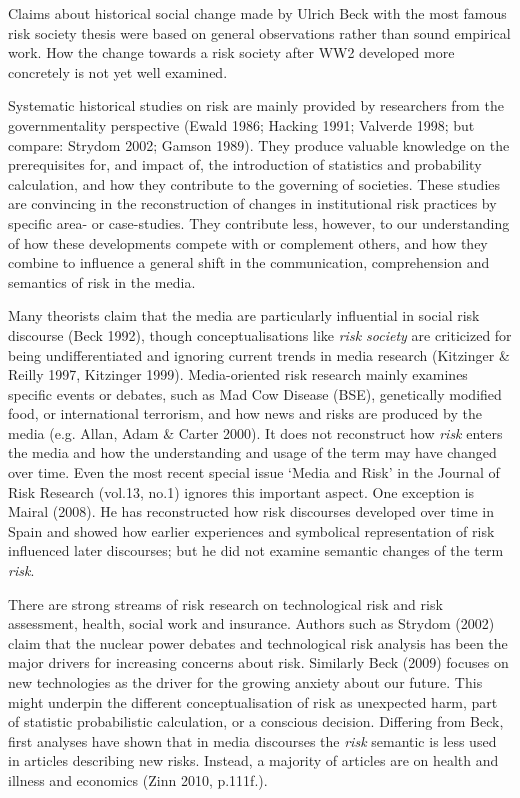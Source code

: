 \documentclass{report}
\begin{document}
Claims about historical social change made by Ulrich Beck with the most famous risk society thesis were based on general observations rather than sound empirical work. How the change towards a risk society after WW2 developed more concretely is not yet well examined.

Systematic historical studies on risk are mainly provided by researchers from the governmentality perspective (Ewald 1986; Hacking 1991; Valverde 1998; but compare: Strydom 2002; Gamson 1989). They produce valuable knowledge on the prerequisites for, and impact of, the introduction of statistics and probability calculation, and how they contribute to the governing of societies. These studies are convincing in the reconstruction of changes in institutional risk practices by specific area- or case-studies. They contribute less, however, to our understanding of how these developments compete with or complement others, and how they combine to influence a general shift in the communication, comprehension and semantics of risk in the media. 

Many theorists claim that the media are particularly influential in social risk discourse (Beck 1992), though conceptualisations like \emph{risk society} are criticized for being undifferentiated and ignoring current trends in media research (Kitzinger \& Reilly 1997, Kitzinger 1999). Media-oriented risk research mainly examines specific events or debates, such as Mad Cow Disease (BSE), genetically modified food, or international terrorism, and how news and risks are produced by the media (e.g. Allan, Adam \& Carter 2000). It does not reconstruct how \emph{risk} enters the media and how the understanding and usage of the term may have changed over time. Even the most recent special issue `Media and Risk' in the Journal of Risk Research (vol.13, no.1) ignores this important aspect. One exception is Mairal (2008). He has reconstructed how risk discourses developed over time in Spain and showed how earlier experiences and symbolical representation of risk influenced later discourses; but he did not examine semantic changes of the term \emph{risk}. 

There are strong streams of risk research on technological risk and risk assessment, health, social work and insurance. Authors such as Strydom (2002) claim that the nuclear power debates and technological risk analysis has been the major drivers for increasing concerns about risk. Similarly Beck (2009) focuses on new technologies as the driver for the growing anxiety about our future. This might underpin the different conceptualisation of risk as unexpected harm, part of statistic probabilistic calculation, or a conscious decision. Differing from Beck, first analyses have shown that in media discourses the \emph{risk} semantic is less used in articles describing new risks. Instead, a majority of articles are on health and illness and economics (Zinn 2010, p.111f.).
\end{document}
